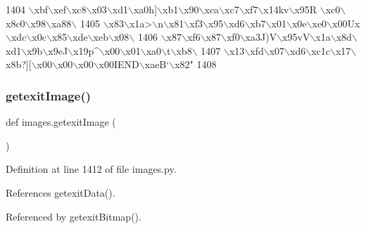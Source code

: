 \begin{DoxyCode}
1404 \textcolor{stringliteral}{\(\backslash\)xbf\(\backslash\)xef\(\backslash\)xc8\(\backslash\)x03\(\backslash\)xd1\(\backslash\)xa0h]\(\backslash\)xb1\(\backslash\)x90\(\backslash\)xca\(\backslash\)xc7\(\backslash\)xf7\(\backslash\)x14kv\(\backslash\)x95R \(\backslash\)xc0\(\backslash\)x8c0\(\backslash\)x98\(\backslash\)xa88\(\backslash\)}
1405 \textcolor{stringliteral}{\(\backslash\)x83\(\backslash\)x1a>\(\backslash\)n\(\backslash\)x81\(\backslash\)xf3\(\backslash\)x95\(\backslash\)xd6\(\backslash\)xb7\(\backslash\)x01\(\backslash\)x0e\(\backslash\)xe0\(\backslash\)x00Ux\(\backslash\)xdc\(\backslash\)x0c\(\backslash\)x85\(\backslash\)xde\(\backslash\)xeb\(\backslash\)x08\(\backslash\)}
1406 \textcolor{stringliteral}{\(\backslash\)x87\(\backslash\)xf6\(\backslash\)x87\(\backslash\)xf0\(\backslash\)xa3J)V\(\backslash\)x95vV\(\backslash\)x1a\(\backslash\)x8d\(\backslash\)xd1\(\backslash\)x9b\(\backslash\)x9eJ\(\backslash\)x19p^\(\backslash\)x00\(\backslash\)x01\(\backslash\)xa0\(\backslash\)t\(\backslash\)xb8\(\backslash\)}
1407 \textcolor{stringliteral}{\(\backslash\)x13\(\backslash\)xfd\(\backslash\)x07\(\backslash\)xd6\(\backslash\)xc1c\(\backslash\)x17\(\backslash\)x8b?][\(\backslash\)x00\(\backslash\)x00\(\backslash\)x00\(\backslash\)x00IEND\(\backslash\)xaeB`\(\backslash\)x82"}
1408 
\end{DoxyCode}
\mbox{\label{namespaceimages_aae00a8f5f5671e8fd7ed806f7f729f9f}} 
\subsubsection{\texorpdfstring{getexit\+Image()}{getexitImage()}}
{\footnotesize\ttfamily def images.\+getexit\+Image (\begin{DoxyParamCaption}{ }\end{DoxyParamCaption})}



Definition at line 1412 of file images.\+py.



References getexit\+Data().



Referenced by getexit\+Bitmap().


